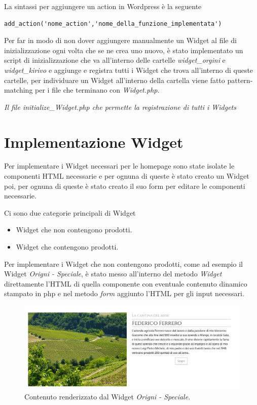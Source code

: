 La sintassi per aggiungere un action in Wordpress è la seguente
\begin{verbatim}
add_action('nome_action','nome_della_funzione_implementata')
\end{verbatim}

Per far in modo di non dover aggiungere manualmente un Widget al file di inizializzazione ogni volta che se ne crea uno nuovo, è
stato implementato un script di inizializzazione che va all'interno delle cartelle \emph{widget\_orgini} e \emph{widget\_kirivo} e aggiunge e registra tutti
i Widget che trova all'interno di queste cartelle, per individuare un Widget all'interno della cartella viene fatto pattern-matching per i file che terminano con \emph{Widget.php}.


\emph{Il file initialize\_Widget.php che permette la registrazione di tutti i Widgets}

\section{Implementazione Widget}
Per implementare i Widget necessari per le homepage sono state isolate le componenti HTML necessarie e per ognuna
di queste è stato creato un Widget poi, per ognuna di queste è stato creato il suo form per editare le componenti necessarie.

Ci sono due categorie principali di Widget
\begin{itemize}
\item Widget che non contengono prodotti.
\item Widget che contengono prodotti.
\end{itemize}

Per implementare i Widget che non contengono prodotti, come ad esempio il Widget \emph{Origni - Speciale}, è stato messo all'interno del metodo \emph{Widget} direttamente
l'HTML di quella componente con eventuale contenuto dinamico stampato in php e nel metodo \emph{form} aggiunto l'HTML per gli input necessari.

\begin{figure}
  \includegraphics[width=\textwidth]{figure/ospec.png}
  \caption{Contenuto renderizzato dal Widget \emph{Origni - Speciale}.}
  \label{fig:ospec1}
\end{figure}

